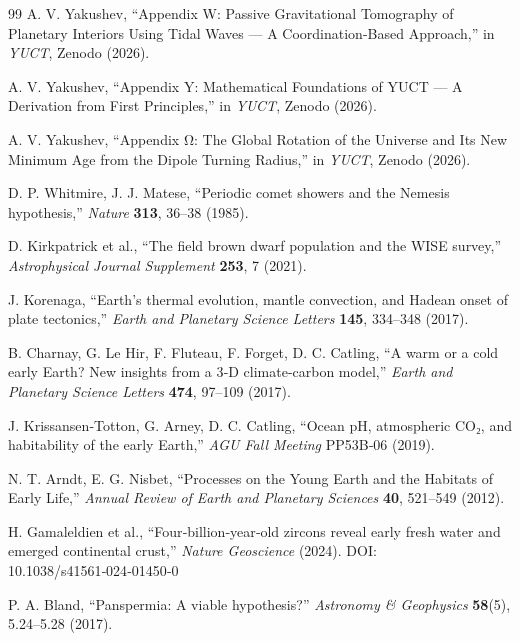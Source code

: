 \documentclass[11pt,a4paper]{article}
\begin{document}
\begin{thebibliography}{99}
		A. V. Yakushev, ``Appendix W: Passive Gravitational Tomography of Planetary Interiors Using Tidal Waves — A Coordination-Based Approach,''
		in \emph{YUCT}, Zenodo (2026).
		
		A. V. Yakushev, ``Appendix Y: Mathematical Foundations of YUCT — A Derivation from First Principles,''
		in \emph{YUCT}, Zenodo (2026).
		
		A. V. Yakushev, ``Appendix Ω: The Global Rotation of the Universe and Its New Minimum Age from the Dipole Turning Radius,''
		in \emph{YUCT}, Zenodo (2026).
		
		D. P. Whitmire, J. J. Matese, ``Periodic comet showers and the Nemesis hypothesis,''
		\emph{Nature} \textbf{313}, 36–38 (1985).
		
		D. Kirkpatrick et al., ``The field brown dwarf population and the WISE survey,''
		\emph{Astrophysical Journal Supplement} \textbf{253}, 7 (2021).
		
		J. Korenaga, ``Earth’s thermal evolution, mantle convection, and Hadean onset of plate tectonics,''
		\emph{Earth and Planetary Science Letters} \textbf{145}, 334–348 (2017).
		
		B. Charnay, G. Le Hir, F. Fluteau, F. Forget, D. C. Catling, ``A warm or a cold early Earth? New insights from a 3‑D climate‑carbon model,''
		\emph{Earth and Planetary Science Letters} \textbf{474}, 97–109 (2017).
		
		J. Krissansen‑Totton, G. Arney, D. C. Catling, ``Ocean pH, atmospheric CO₂, and habitability of the early Earth,''
		\emph{AGU Fall Meeting} PP53B‑06 (2019).
		
		N. T. Arndt, E. G. Nisbet, ``Processes on the Young Earth and the Habitats of Early Life,''
		\emph{Annual Review of Earth and Planetary Sciences} \textbf{40}, 521–549 (2012).
		
		H. Gamaleldien et al., ``Four‑billion‑year‑old zircons reveal early fresh water and emerged continental crust,''
		\emph{Nature Geoscience} (2024). DOI: 10.1038/s41561‑024‑01450‑0
		
		P. A. Bland, ``Panspermia: A viable hypothesis?''
		\emph{Astronomy \& Geophysics} \textbf{58}(5), 5.24–5.28 (2017).
		

\end{thebibliography}
\end{document}
